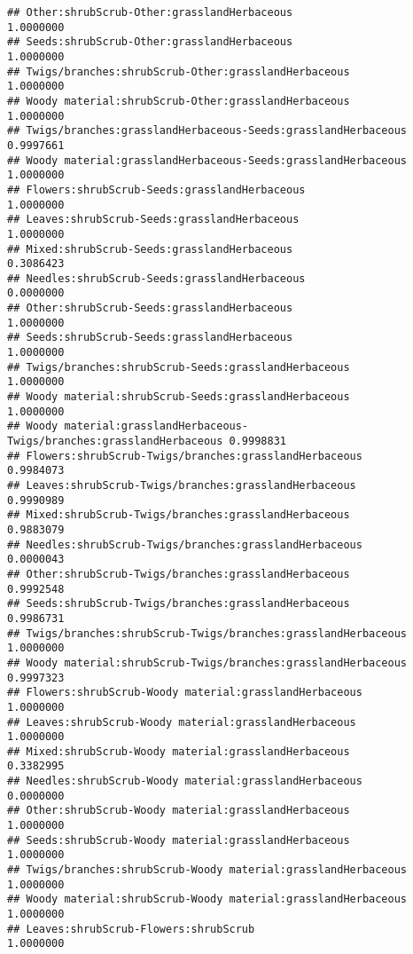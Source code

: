 \documentclass[
]{article}
\begin{document}
\begin{verbatim}
## Other:shrubScrub-Other:grasslandHerbaceous                            1.0000000
## Seeds:shrubScrub-Other:grasslandHerbaceous                            1.0000000
## Twigs/branches:shrubScrub-Other:grasslandHerbaceous                   1.0000000
## Woody material:shrubScrub-Other:grasslandHerbaceous                   1.0000000
## Twigs/branches:grasslandHerbaceous-Seeds:grasslandHerbaceous          0.9997661
## Woody material:grasslandHerbaceous-Seeds:grasslandHerbaceous          1.0000000
## Flowers:shrubScrub-Seeds:grasslandHerbaceous                          1.0000000
## Leaves:shrubScrub-Seeds:grasslandHerbaceous                           1.0000000
## Mixed:shrubScrub-Seeds:grasslandHerbaceous                            0.3086423
## Needles:shrubScrub-Seeds:grasslandHerbaceous                          0.0000000
## Other:shrubScrub-Seeds:grasslandHerbaceous                            1.0000000
## Seeds:shrubScrub-Seeds:grasslandHerbaceous                            1.0000000
## Twigs/branches:shrubScrub-Seeds:grasslandHerbaceous                   1.0000000
## Woody material:shrubScrub-Seeds:grasslandHerbaceous                   1.0000000
## Woody material:grasslandHerbaceous-Twigs/branches:grasslandHerbaceous 0.9998831
## Flowers:shrubScrub-Twigs/branches:grasslandHerbaceous                 0.9984073
## Leaves:shrubScrub-Twigs/branches:grasslandHerbaceous                  0.9990989
## Mixed:shrubScrub-Twigs/branches:grasslandHerbaceous                   0.9883079
## Needles:shrubScrub-Twigs/branches:grasslandHerbaceous                 0.0000043
## Other:shrubScrub-Twigs/branches:grasslandHerbaceous                   0.9992548
## Seeds:shrubScrub-Twigs/branches:grasslandHerbaceous                   0.9986731
## Twigs/branches:shrubScrub-Twigs/branches:grasslandHerbaceous          1.0000000
## Woody material:shrubScrub-Twigs/branches:grasslandHerbaceous          0.9997323
## Flowers:shrubScrub-Woody material:grasslandHerbaceous                 1.0000000
## Leaves:shrubScrub-Woody material:grasslandHerbaceous                  1.0000000
## Mixed:shrubScrub-Woody material:grasslandHerbaceous                   0.3382995
## Needles:shrubScrub-Woody material:grasslandHerbaceous                 0.0000000
## Other:shrubScrub-Woody material:grasslandHerbaceous                   1.0000000
## Seeds:shrubScrub-Woody material:grasslandHerbaceous                   1.0000000
## Twigs/branches:shrubScrub-Woody material:grasslandHerbaceous          1.0000000
## Woody material:shrubScrub-Woody material:grasslandHerbaceous          1.0000000
## Leaves:shrubScrub-Flowers:shrubScrub                                  1.0000000

\end{verbatim}
\end{document}
